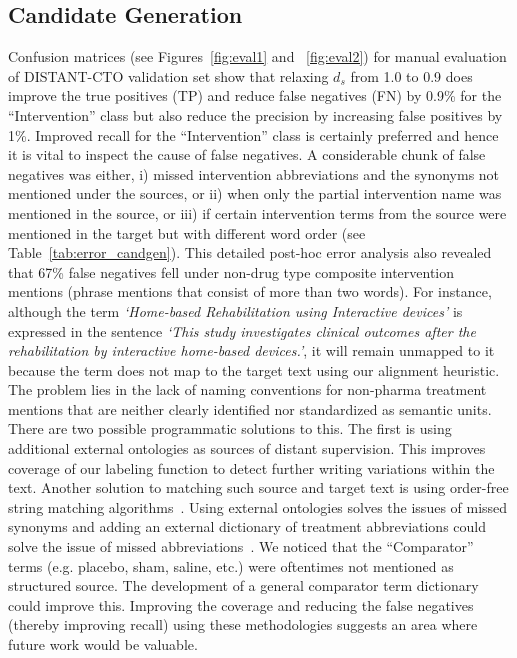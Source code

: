 \documentclass[11pt]{article}
\begin{document}
\subsection{Candidate Generation }
\label{subsec:cand_gen}
%
Confusion matrices (see Figures~\ref{fig:eval1} and ~\ref{fig:eval2}) for manual evaluation of DISTANT-CTO validation set show that relaxing $d_{s}$ from 1.0 to 0.9 does improve the true positives (TP) and reduce false negatives (FN) by 0.9\% for the ``Intervention'' class but also reduce the precision by increasing false positives by 1\%.
Improved recall for the ``Intervention'' class is certainly preferred and hence it is vital to inspect the cause of false negatives.
A considerable chunk of false negatives was either, i) missed intervention abbreviations and the synonyms not mentioned under the sources, or ii) when only the partial intervention name was mentioned in the source, or iii) if certain intervention terms from the source were mentioned in the target but with different word order (see Table~\ref{tab:error_candgen}).
This detailed post-hoc error analysis also revealed that 67\% false negatives fell under non-drug type composite intervention mentions (phrase mentions that consist of more than two words).
For instance, although the term \textit{`Home-based Rehabilitation using Interactive devices'} is expressed in the sentence \textit{`This study investigates clinical outcomes after the rehabilitation by interactive home-based devices.'}, it will remain unmapped to it because the term does not map to the target text using our alignment heuristic.
The problem lies in the lack of naming conventions for non-pharma treatment mentions that are neither clearly identified nor standardized as semantic units\cite{dhrangadhariya2021multipico}.
There are two possible programmatic solutions to this.
The first is using additional external ontologies as sources of distant supervision.
This improves coverage of our labeling function to detect further writing variations within the text.
Another solution to matching such source and target text is using order-free string matching algorithms~\cite{apostolico1992combinatorial}.
Using external ontologies solves the issues of missed synonyms and adding an external dictionary of treatment abbreviations could solve the issue of missed abbreviations~\cite{fries2021ontology}.
We noticed that the ``Comparator'' terms (e.g. placebo, sham, saline, etc.) were oftentimes not mentioned as structured source.
The development of a general comparator term dictionary could improve this.
Improving the coverage and reducing the false negatives (thereby improving recall) using these methodologies suggests an area where future work would be valuable.
\end{document}
